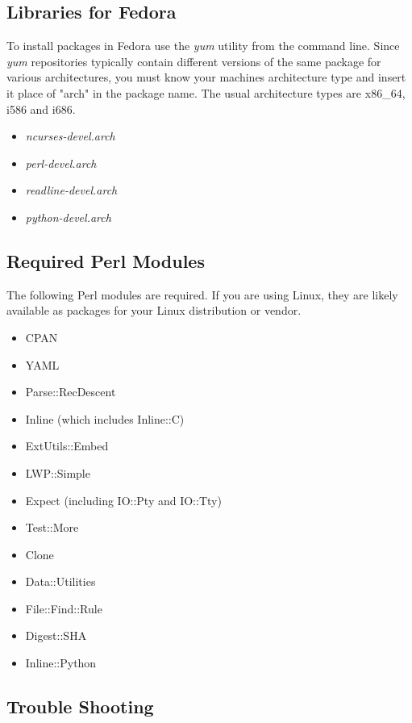 \documentclass[12pt]{article}
\begin{document}
\subsection*{Libraries for Fedora}

To install packages in Fedora use the {\it yum} utility from the command line. Since {\it yum} repositories typically contain different versions of the same package for various architectures, you must know your machines architecture type and insert it place of "arch" in the package name. The usual architecture types are x86\_64, i586 and i686.

\begin{itemize}
\item {\it ncurses-devel.arch}
\item {\it perl-devel.arch}
\item {\it readline-devel.arch}
\item {\it python-devel.arch}
\end{itemize}



\subsection*{Required Perl Modules}

The following Perl modules are required.  If you are using Linux, they
are likely available as packages for your Linux distribution or vendor.

\begin{itemize}
   \item CPAN
   \item YAML
   \item Parse::RecDescent
   \item Inline (which includes Inline::C)
   \item ExtUtils::Embed
   \item LWP::Simple
   \item Expect (including IO::Pty and IO::Tty)
   \item Test::More
   \item Clone
   \item Data::Utilities
   \item File::Find::Rule
   \item Digest::SHA
   \item Inline::Python
\end{itemize}

\subsection*{Trouble Shooting}
\end{document}
